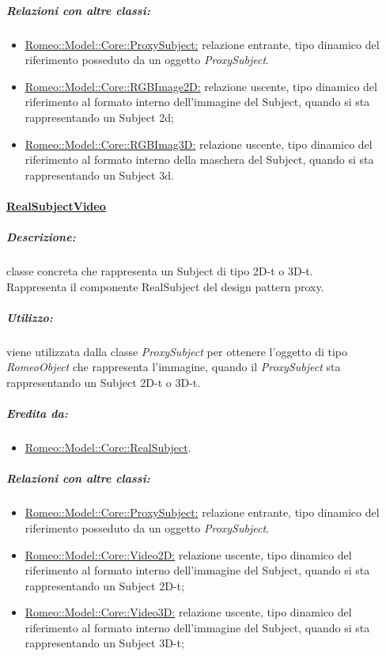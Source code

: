			\subparagraph{Relazioni con altre classi:}
				\begin{itemize}
					\item \hyperref[]{Romeo::Model::Core::ProxySubject:} relazione entrante, tipo dinamico del riferimento posseduto da un oggetto \textsl{ProxySubject}.
					
					\item \hyperref[RGBImage2D]{Romeo::Model::Core::RGBImage2D:} relazione uscente,  tipo dinamico del riferimento al formato interno dell'immagine del Subject\g{}, quando si sta rappresentando un Subject\g{}  2d;
					
					\item \hyperref[RGBImage3D]{Romeo::Model::Core::RGBImag3D:} relazione uscente, tipo dinamico del riferimento al formato interno della maschera del Subject\g{}, quando si sta rappresentando un Subject\g{} 3d.
				\end{itemize}

		\paragraph{\underline{RealSubjectVideo}}
		\label{core_realvideo
		}
			\subparagraph{Descrizione:} classe concreta che rappresenta un Subject\g{} di tipo 2D-t o 3D-t.
			\\Rappresenta il componente RealSubject del design pattern\g{} proxy.
			
			\subparagraph{Utilizzo:} viene utilizzata dalla classe \textsl{ProxySubject} per ottenere l'oggetto di tipo \textsl{RomeoObject} che rappresenta l'immagine, quando il \textsl{ProxySubject} sta rappresentando un Subject\g{} 2D-t o 3D-t.
			
			\subparagraph{Eredita da:}
				\begin{itemize}
					\item \hyperref[core_realsub]{Romeo::Model::Core::RealSubject}.
				\end{itemize}
				
			\subparagraph{Relazioni con altre classi:}
				\begin{itemize}
				
					\item \hyperref[]{Romeo::Model::Core::ProxySubject:} relazione entrante, tipo dinamico del riferimento posseduto da un oggetto \textsl{ProxySubject}.
				
					\item \hyperref[]{Romeo::Model::Core::Video2D:} relazione uscente, tipo dinamico del riferimento al formato interno dell'immagine del Subject\g{}, quando si sta rappresentando un Subject\g{} 2D-t;
					
					\item \hyperref[]{Romeo::Model::Core::Video3D:} relazione uscente, tipo dinamico del riferimento al formato interno dell'immagine del Subject\g{}, quando si sta rappresentando un Subject\g{} 3D-t;
				\end{itemize}

